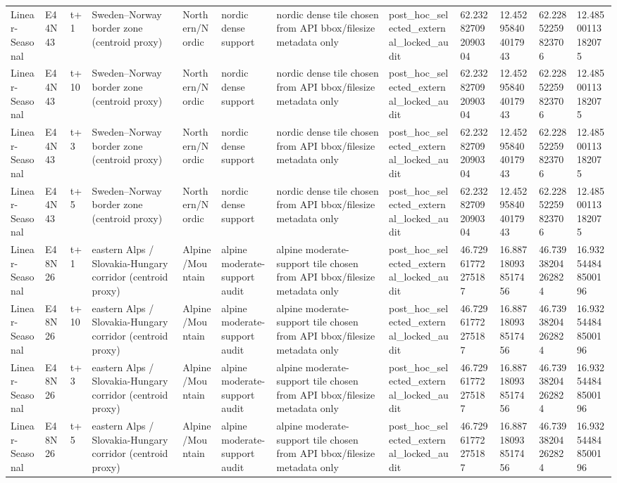 \begin{landscape}
\begin{longtable}{llllllllllll}
Linear-Seasonal & E44N43 & t+1 & Sweden–Norway border zone (centroid proxy) & Northern/Nordic & nordic dense support & nordic dense tile chosen from API bbox/filesize metadata only & post\_hoc\_selected\_external\_locked\_audit & 62.232827092090304 & 12.452958404017943 & 62.22852259823706 & 12.48500113182075 \\
Linear-Seasonal & E44N43 & t+10 & Sweden–Norway border zone (centroid proxy) & Northern/Nordic & nordic dense support & nordic dense tile chosen from API bbox/filesize metadata only & post\_hoc\_selected\_external\_locked\_audit & 62.232827092090304 & 12.452958404017943 & 62.22852259823706 & 12.48500113182075 \\
Linear-Seasonal & E44N43 & t+3 & Sweden–Norway border zone (centroid proxy) & Northern/Nordic & nordic dense support & nordic dense tile chosen from API bbox/filesize metadata only & post\_hoc\_selected\_external\_locked\_audit & 62.232827092090304 & 12.452958404017943 & 62.22852259823706 & 12.48500113182075 \\
Linear-Seasonal & E44N43 & t+5 & Sweden–Norway border zone (centroid proxy) & Northern/Nordic & nordic dense support & nordic dense tile chosen from API bbox/filesize metadata only & post\_hoc\_selected\_external\_locked\_audit & 62.232827092090304 & 12.452958404017943 & 62.22852259823706 & 12.48500113182075 \\
Linear-Seasonal & E48N26 & t+1 & eastern Alps / Slovakia-Hungary corridor (centroid proxy) & Alpine/Mountain & alpine moderate-support audit & alpine moderate-support tile chosen from API bbox/filesize metadata only & post\_hoc\_selected\_external\_locked\_audit & 46.72961772275187 & 16.887180938517456 & 46.73938204262824 & 16.932544848500196 \\
Linear-Seasonal & E48N26 & t+10 & eastern Alps / Slovakia-Hungary corridor (centroid proxy) & Alpine/Mountain & alpine moderate-support audit & alpine moderate-support tile chosen from API bbox/filesize metadata only & post\_hoc\_selected\_external\_locked\_audit & 46.72961772275187 & 16.887180938517456 & 46.73938204262824 & 16.932544848500196 \\
Linear-Seasonal & E48N26 & t+3 & eastern Alps / Slovakia-Hungary corridor (centroid proxy) & Alpine/Mountain & alpine moderate-support audit & alpine moderate-support tile chosen from API bbox/filesize metadata only & post\_hoc\_selected\_external\_locked\_audit & 46.72961772275187 & 16.887180938517456 & 46.73938204262824 & 16.932544848500196 \\
Linear-Seasonal & E48N26 & t+5 & eastern Alps / Slovakia-Hungary corridor (centroid proxy) & Alpine/Mountain & alpine moderate-support audit & alpine moderate-support tile chosen from API bbox/filesize metadata only & post\_hoc\_selected\_external\_locked\_audit & 46.72961772275187 & 16.887180938517456 & 46.73938204262824 & 16.932544848500196 \\

\end{longtable}
\end{landscape}
